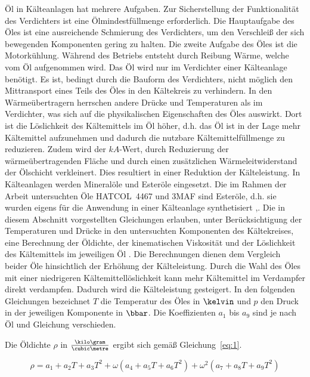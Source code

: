 Öl in Kälteanlagen hat mehrere Aufgaben. Zur Sicherstellung der Funktionalität des Verdichters ist eine Ölmindestfüllmenge erforderlich. Die Hauptaufgabe des Öles ist eine ausreichende Schmierung des Verdichters, um den Verschleiß der sich bewegenden Komponenten gering zu halten. \newline
Die zweite Aufgabe des Öles ist die Motorkühlung. Während des Betriebs entsteht durch Reibung Wärme, welche vom Öl aufgenommen wird. Das Öl wird nur im Verdichter einer Kälteanlage benötigt. Es ist, bedingt durch die Bauform des Verdichters, nicht möglich den Mittransport eines Teils des Öles in den Kältekreis zu verhindern. In den Wärmeübertragern herrschen andere Drücke und Temperaturen als im Verdichter, was sich auf die physikalischen Eigenschaften des Öles auswirkt. Dort ist die Löslichkeit des Kältemittels im Öl höher, d.h. das Öl ist in der Lage mehr Kältemittel aufzunehmen und dadurch die nutzbare Kältemittelfüllmenge zu reduzieren. Zudem wird der $kA$-Wert, durch Reduzierung der wärmeübertragenden Fläche und durch einen zusätzlichen Wärmeleitwiderstand der Ölschicht verkleinert. Dies resultiert in einer Reduktion der Kälteleistung. \newline
In Kälteanlagen werden Mineralöle und Esteröle eingesetzt. Die im Rahmen der Arbeit untersuchten Öle HATCOL~4467 und 3MAF sind Esteröle, d.h. sie wurden eigens für die Anwendung in einer Kälteanlage synthetisiert \cite{ChemturaCorporation.2017},\cite{LubrizolCorporation.2015}. 
Die in diesem Abschnitt vorgestellten Gleichungen erlauben, unter Berücksichtigung der  Temperaturen und Drücke in den untersuchten Komponenten des Kältekreises, eine Berechnung der Öldichte, der kinematischen Viskosität und der Löslichkeit des Kältemittels im jeweiligen Öl \cite{EmersonClimateTechnologies.b}. Die Berechnungen dienen dem Vergleich beider Öle hinsichtlich der Erhöhung der Kälteleistung. Durch die Wahl des Öles mit einer niedrigeren Kältemittellöslichkeit kann mehr Kältemittel im Verdampfer direkt verdampfen. Dadurch wird die Kälteleistung gesteigert. In den folgenden Gleichungen bezeichnet $T$ die Temperatur des Öles in $\kelvin$ und $p$ den Druck in der jeweiligen Komponente in $\bbar$. Die Koeffizienten $a_1$ bis $a_9$ sind je nach Öl und Gleichung verschieden.

Die Öldichte $\rho$ in $\frac{\kilo\gram}{\cubic\metre}$ ergibt sich gemäß Gleichung~\ref{eq:1}. 

\begin{equation}
\label{eq:1}
\rho = a_{1} + a_{2}T + a_{3}T^2 + \omega(a_{4}+ a_{5}T + a_{6}T^2) + \omega^2(a_{7}+ a_{8}T + a_{9}T^2)
\end{equation}


